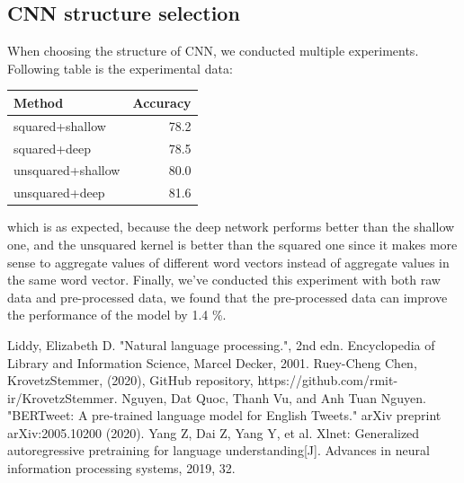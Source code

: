 \documentclass[journal]{IEEEtran}
\begin{document}
\subsection{CNN structure selection}
When choosing the structure of CNN, we conducted multiple experiments. Following table is the experimental data:

\bigskip
\begin{center}
\begin{tabular}{|l|r|}
\hline 
Method&Accuracy\\
\hline  
squared+shallow&78.2\\
\hline 
squared+deep&78.5\\
\hline
unsquared+shallow&80.0\\
\hline
unsquared+deep&81.6\\
\hline
\end{tabular}
\end{center}

which is as expected, because the deep network performs better than the shallow one, and the unsquared kernel is better than the squared one since it makes more sense to aggregate values of different word vectors instead of aggregate values in the same word vector. Finally, we've conducted this experiment with both raw data and pre-processed data, we found that the pre-processed data can improve the performance of the model by 1.4 \%.


\begin{thebibliography}{99}  
 Liddy, Elizabeth D. "Natural language processing.", 2nd edn. Encyclopedia of Library and Information Science, Marcel Decker, 2001.
Ruey-Cheng Chen, KrovetzStemmer, (2020), GitHub repository, https://github.com/rmit-ir/KrovetzStemmer.
Nguyen, Dat Quoc, Thanh Vu, and Anh Tuan Nguyen. "BERTweet: A pre-trained language model for English Tweets." arXiv preprint arXiv:2005.10200 (2020).
Yang Z, Dai Z, Yang Y, et al. Xlnet: Generalized autoregressive pretraining for language understanding[J]. Advances in neural information processing systems, 2019, 32.
\end{thebibliography}
\end{document}

